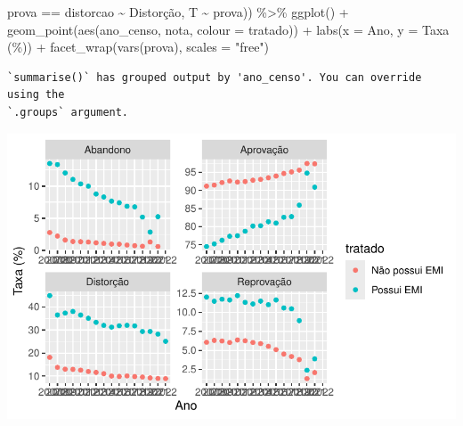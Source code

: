 \documentclass[
  letterpaper,
  DIV=11,
  numbers=noendperiod]{scrartcl}
\newenvironment{Shaded}{\begin{snugshade}}{\end{snugshade}}
\newcommand{\AttributeTok}[1]{\textcolor[rgb]{0.40,0.45,0.13}{#1}}
\newcommand{\FunctionTok}[1]{\textcolor[rgb]{0.28,0.35,0.67}{#1}}
\newcommand{\NormalTok}[1]{\textcolor[rgb]{0.00,0.23,0.31}{#1}}
\newcommand{\SpecialCharTok}[1]{\textcolor[rgb]{0.37,0.37,0.37}{#1}}
\newcommand{\StringTok}[1]{\textcolor[rgb]{0.13,0.47,0.30}{#1}}
\begin{document}
\begin{Shaded}
\begin{Highlighting}[]
\NormalTok{                         prova }\SpecialCharTok{==} \StringTok{\textquotesingle{}distorcao\textquotesingle{}} \SpecialCharTok{\textasciitilde{}} \StringTok{\textquotesingle{}Distorção\textquotesingle{}}\NormalTok{,}
\NormalTok{                         T }\SpecialCharTok{\textasciitilde{}}\NormalTok{ prova)) }\SpecialCharTok{\%\textgreater{}\%} 
  \FunctionTok{ggplot}\NormalTok{() }\SpecialCharTok{+}
  \FunctionTok{geom\_point}\NormalTok{(}\FunctionTok{aes}\NormalTok{(ano\_censo, nota, }\AttributeTok{colour =}\NormalTok{ tratado)) }\SpecialCharTok{+}
  \FunctionTok{labs}\NormalTok{(}\AttributeTok{x =} \StringTok{\textquotesingle{}Ano\textquotesingle{}}\NormalTok{, }\AttributeTok{y =} \StringTok{\textquotesingle{}Taxa (\%)\textquotesingle{}}\NormalTok{) }\SpecialCharTok{+}
  \FunctionTok{facet\_wrap}\NormalTok{(}\FunctionTok{vars}\NormalTok{(prova), }\AttributeTok{scales =} \StringTok{"free"}\NormalTok{)}
\end{Highlighting}
\end{Shaded}

\begin{verbatim}
`summarise()` has grouped output by 'ano_censo'. You can override using the
`.groups` argument.
\end{verbatim}

\includegraphics[width=1\textwidth,height=1\textheight]{script_files/figure-latex/unnamed-chunk-10-2.pdf}
\end{document}
